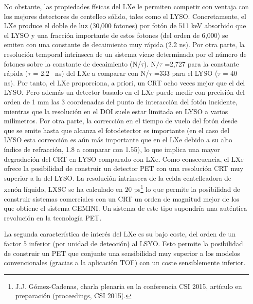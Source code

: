 No obstante, las propiedades físicas del LXe le permiten competir con ventaja con los mejores detectores de centelleo sólido, tales como el LYSO. Concretamente, el LXe produce el doble de luz (30,000 fotones) por fotón de 511 keV absorbido que el LYSO y una fracción importante de estos fotones (del orden de 6,000) se emiten con una constante de decaimiento muy rápida (2.2 ns). Por otra parte, la resolución temporal intrínseca de un sistema viene determinada por el número de fotones sobre la constante de decaimiento (N/$\tau$). N$/\tau$ =2,727 para la constante rápida ($\tau$ = 2.2~ ns) del LXe a comparar con N/$\tau$ =333 para el LYSO ($\tau$ = 40~ ns). Por tanto, el LXe proporciona, a priori, un CRT ocho veces mejor que el del LYSO. Pero además un detector basado en el LXe puede medir con precisión del orden de 1 mm las 3 coordenadas del punto de interacción del fotón incidente, mientras que la resolución en el DOI suele estar limitada en LYSO a varios milímetros. Por otra parte, la corrección en el tiempo de vuelo del fotón desde que se emite hasta que alcanza el fotodetector es importante (en el caso del LYSO esta corrección es aún más importante que en el LXe debido a su alto índice de refracción, 1.8 a comparar con 1.55), lo que implica una mayor degradación del CRT en LYSO comparado con LXe. Como consecuencia, el LXe ofrece la posibilidad de construir un detector PET con una resolución CRT muy superior a la del LYSO. La resolución intrínseca de la celda centelleadora de xenón líquido, LXSC  se ha calculado en 20 ps\footnote{J.J. Gómez-Cadenas, charla plenaria en la conferencia CSI 2015, artículo en preparación (proceedings, CSI 2015). }  lo que permite la posibilidad de construir sistemas comerciales con un CRT un orden de magnitud mejor de los que obtiene el sistema GEMINI. Un sistema de este tipo supondría una auténtica revolución en la tecnología PET.

La segunda característica de interés del LXe es su bajo coste, del orden de un factor 5 inferior (por unidad de detección) al LSYO. Esto permite la posibilidad de construir un PET que conjunte una sensibilidad muy superior a los modelos convencionales (gracias a la aplicación TOF) con un coste sensiblemente inferior. 

\begin{center}  \end{center} 

